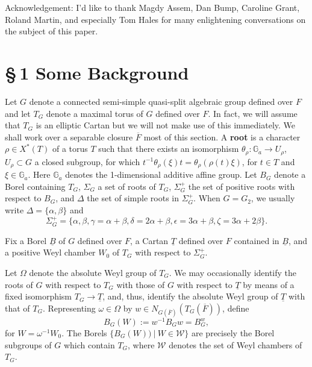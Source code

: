 \documentclass[12pt,letterpaper]{amsart}
\newcommand{\gga}{\mathbb{G}}
\begin{document}
\medskip
Acknowledgement: I'd like to thank Magdy Assem, Dan Bump,
Caroline Grant, Roland Martin, and especially Tom Hales for many
enlightening conversations on the subject of this paper.
\section*{\S\,1 Some Background}

Let $G$ denote a connected semi-simple
quasi-split algebraic group defined over
$F$ and let $T_G$ denote a maximal torus of $G$ defined
over $F$.
In fact, we will assume that $T_G$ is an elliptic Cartan
but we will not make use of this immediately.
We shall work over a separable closure $\overline{F}$
most of this section.
A \textbf{root} is a character
$\rho\in X^*(T)$ of a torus $T$ such that there exists an isomorphism
$\theta_\rho :\gga_a\rightarrow U_\rho$, $U_\rho\subset G$
a closed subgroup, for which $t^{-1}\theta_\rho(\xi)t=
\theta_\rho(\rho(t)\xi)$, for $t\in T$ and $\xi\in\gga_a$.
Here $\gga_a$ denotes the 1-dimensional additive affine group.
Let $B_G$ denote a Borel containing $T_G$,
$\Sigma_G$ a set of roots of $T_G$, $\Sigma_G^+$ the set of
positive roots with respect to $B_G$,
and $\Delta$ the set of simple roots in $\Sigma_G^+$.
When $G=G_2$, we usually write
$\Delta=\{\alpha,\beta\}$ and
\[
\Sigma_G^+=\{\alpha,\beta,\gamma=\alpha+\beta,
\delta=2\alpha+\beta,\epsilon=3\alpha+\beta,
\zeta=3\alpha+2\beta\}.
\]

Fix a Borel $\underline{B}$ of $G$ defined over ${F}$, a Cartan
$\underline{T}$ defined over $F$ contained in $\underline{B}$,
and a positive Weyl chamber $W_0$ of $T_G$ with respect to
$\Sigma_G^+$.

Let $\Omega$ denote the absolute Weyl group of $T_G$.
We may occasionally identify the roots of $G$ with respect to $T_G$
with those of $G$ with respect to $\underline{T}$ by means of
a fixed isomorphism $T_G\rightarrow \underline{T}$, and, thus, identify
the absolute Weyl group of $\underline{T}$ with that of $T_G$.
Representing $\omega\in \Omega$ by
$w\in N_{G(\overline{F})}({T}_G(\overline{F}))$,
define
\[
{B}_G(W):=w^{-1}{B}_Gw={B}_G^w,
\]
for $W=\omega^{-1}W_0$.
The Borels
$\{{B}_G(W))\ |\ W\in {\mathcal W}\}$ are precisely the Borel
subgroups of $G$ which contain ${T}_G$, where ${\mathcal W}$ denotes
the set of Weyl chambers of $T_G$.
\end{document}
